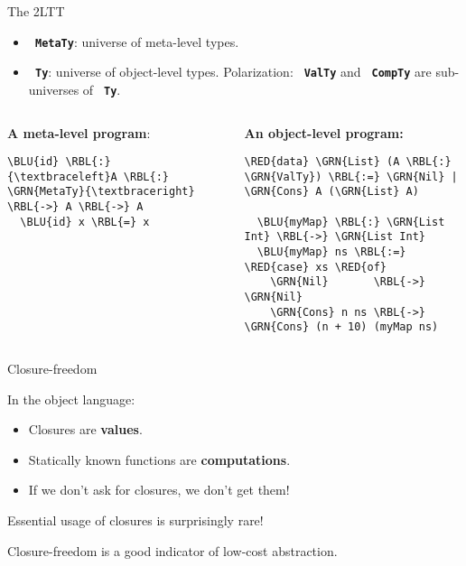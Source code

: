 \documentclass[dvipsnames,aspectratio=169]{beamer}
\newcommand{\ttt}[1]{{\texttt{#1}}}
\theoremstyle{remark}
\newcommand{\RED}[1]{{\color{BrickRed} #1}}
\newcommand{\GRN}[1]{{\color{OliveGreen} #1}}
\newcommand{\RBL}[1]{{\color{RoyalBlue} #1}}
\newcommand{\BLU}[1]{{\color{Blue} #1}}
\begin{document}
\begin{frame}[fragile]{The 2LTT}

\begin{itemize}
  \item \textbf{\ttt{\GRN{MetaTy}}}: universe of meta-level types.
  \item \textbf{\ttt{\GRN{Ty}}}: universe of object-level types. \alert{Polarization}:
    \textbf{\ttt{\GRN{ValTy}}} and \textbf{\ttt{\GRN{CompTy}}} are sub-universes of \textbf{\ttt{\GRN{Ty}}}.
\end{itemize}
\vspace{2em}

\begin{columns}
\begin{column}{0.4\textwidth}
\textbf{A meta-level program}:
\begin{Verbatim}[commandchars=\\\{\}]
  \BLU{id} \RBL{:} {\textbraceleft}A \RBL{:} \GRN{MetaTy}{\textbraceright} \RBL{->} A \RBL{->} A
  \BLU{id} x \RBL{=} x




\end{Verbatim}
\end{column}

\begin{column}{0.6\textwidth}
\textbf{An object-level program:}
\begin{Verbatim}[commandchars=\\\{\}]
  \RED{data} \GRN{List} (A \RBL{:} \GRN{ValTy}) \RBL{:=} \GRN{Nil} | \GRN{Cons} A (\GRN{List} A)

  \BLU{myMap} \RBL{:} \GRN{List Int} \RBL{->} \GRN{List Int}
  \BLU{myMap} ns \RBL{:=} \RED{case} xs \RED{of}
    \GRN{Nil}       \RBL{->} \GRN{Nil}
    \GRN{Cons} n ns \RBL{->} \GRN{Cons} (n + 10) (myMap ns)
\end{Verbatim}
\end{column}
\end{columns}
\end{frame}

\begin{frame}[fragile]{Closure-freedom}

In the object language:
\begin{itemize}
  \item Closures are \textbf{values}.
  \item Statically known functions are \textbf{computations}.
  \item If we don't ask for closures, we don't get them!
\end{itemize}
\vspace{1em}

Essential usage of closures is surprisingly rare!

\vspace{1em}
Closure-freedom is a good indicator of low-cost abstraction.


\end{frame}
\end{document}
